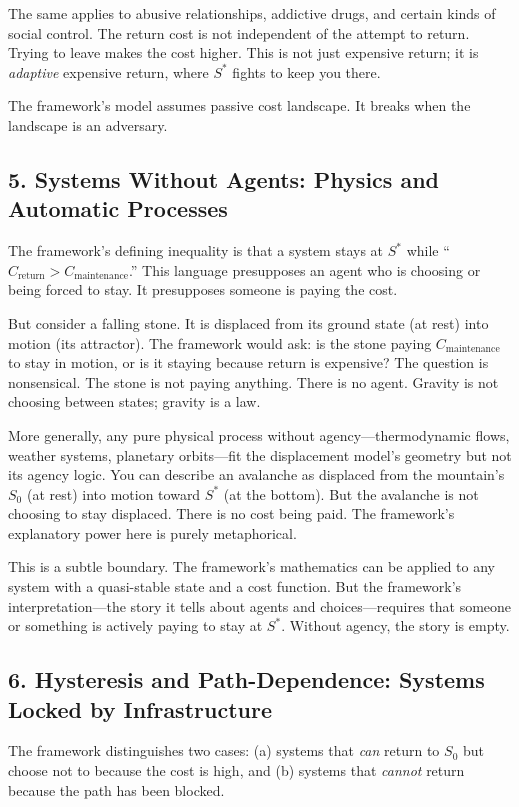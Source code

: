 \documentclass[12pt]{article}
\begin{document}
The same applies to abusive relationships, addictive drugs, and certain kinds of social control. The return cost is not independent of the attempt to return. Trying to leave makes the cost higher. This is not just expensive return; it is \textit{adaptive} expensive return, where $S^*$ fights to keep you there.

The framework's model assumes passive cost landscape. It breaks when the landscape is an adversary.

\subsection{5. Systems Without Agents: Physics and Automatic Processes}

The framework's defining inequality is that a system stays at $S^*$ while ``$C_{\text{return}} > C_{\text{maintenance}}$.'' This language presupposes an agent who is choosing or being forced to stay. It presupposes someone is paying the cost.

But consider a falling stone. It is displaced from its ground state (at rest) into motion (its attractor). The framework would ask: is the stone paying $C_{\text{maintenance}}$ to stay in motion, or is it staying because return is expensive? The question is nonsensical. The stone is not paying anything. There is no agent. Gravity is not choosing between states; gravity is a law.

More generally, any pure physical process without agency—thermodynamic flows, weather systems, planetary orbits—fit the displacement model's geometry but not its agency logic. You can describe an avalanche as displaced from the mountain's $S_0$ (at rest) into motion toward $S^*$ (at the bottom). But the avalanche is not choosing to stay displaced. There is no cost being paid. The framework's explanatory power here is purely metaphorical.

This is a subtle boundary. The framework's mathematics can be applied to any system with a quasi-stable state and a cost function. But the framework's interpretation—the story it tells about agents and choices—requires that someone or something is actively paying to stay at $S^*$. Without agency, the story is empty.

\subsection{6. Hysteresis and Path-Dependence: Systems Locked by Infrastructure}

The framework distinguishes two cases: (a) systems that \textit{can} return to $S_0$ but choose not to because the cost is high, and (b) systems that \textit{cannot} return because the path has been blocked.
\end{document}
